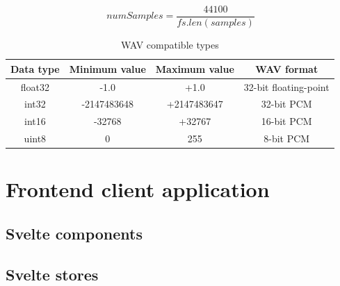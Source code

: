 \begin{equation}
    \label{formula:sampling}
    numSamples = \frac{44100}{fs.len(samples)}
\end{equation}


\begin{table}[]
    \centering
    \begin{tabular}{|c|c|c|c|}
    \hline
    \textbf{Data type} & \textbf{Minimum value} & \textbf{Maximum value} & \textbf{WAV format} \\
    \hline
    float32 & -1.0 & +1.0 & 32-bit floating-point \\ \hline
    int32 & -2147483648 & +2147483647 & 32-bit PCM \\ \hline
    int16 & -32768 & +32767 & 16-bit PCM \\ \hline
    uint8 & 0 & 255 & 8-bit PCM \\
    \hline
    \end{tabular}
    \caption{WAV compatible types}
    \label{tab:my_label}
\end{table}





\section{Frontend client application}\label{txt.implementation.svelte}
\subsection{Svelte components}\label{txt.implementation.components}
\subsection{Svelte stores}\label{txt.implementation.stores}


